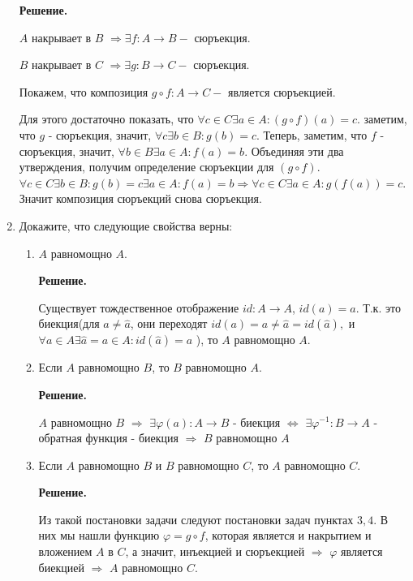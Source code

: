 \begin{enumerate}
\textbf{Решение.} 

$A$ накрывает в $B$ $\Rightarrow \exists f:A\rightarrow B - $ сюръекция.

$B$ накрывает в $C$ $\Rightarrow \exists g:B\rightarrow C - $ сюръекция.

Покажем, что композиция $g \circ f : A\rightarrow C - $ является 
сюръекцией.

Для этого достаточно показать, что $\forall c \in C \exists a \in A : (g 
\circ f)(a) = c$. заметим, что $g$ - сюръекция, значит, $\forall c \exists 
b \in B : g(b) = c$. Теперь, заметим, что $f$ - сюръекция, значит, 
$\forall b \in B \exists a \in A : f(a) = b$. Объединяя эти два 
утверждения, получим определение сюръекции для $(g \circ f)$. $\forall c 
\in C \exists b \in B : g(b) = c \exists a \in A : f(a) = b \Rightarrow 
\forall c \in C \exists a \in A : g(f(a)) = c$. Значит композиция 
сюръекций снова сюръекция.

\item Докажите, что следующие свойства верны:
\begin{enumerate}
\item $A$ равномощно $A$.

\textbf{Решение.} 

Существует тождественное отображение $id: A\rightarrow A$, $id(a) = a$. 
Т.к. это биекция(для 
$a\neq \hat{a}$, они переходят $id(a) = a \neq \hat{a} = id(\hat{a}),$ и 
$\forall a\in A 
\exists\hat{a} = a \in A : id(\hat{a}) = a$ ), то $A$ равномощно $A$. 

\item Если $A$ равномощно $B$, то $B$ равномощно $A$.

\textbf{Решение.} 

$A$ равномощно $B$ $\Rightarrow$ $\exists \varphi(a):A\rightarrow B$ - 
биекция 
$\Leftrightarrow$ $\exists \varphi^{-1} : B \rightarrow A$ - обратная 
функция - биекция 
$\Rightarrow$ $B$ равномощно $A$ 


\item Если $A$ равномощно $B$ и $B$ равномощно $C$, то $A$ равномощно $C$.

\textbf{Решение.} 

Из такой постановки задачи следуют постановки задач пунктах $3, 4$. В них 
мы нашли функцию 
$\varphi = g \circ f$, которая является и накрытием и вложением $A$ в $C$, 
а значит, инъекцией 
и сюръекцией $\Rightarrow$ $\varphi$ является биекцией $\Rightarrow$ $A$ 
равномощно $C$.

\end{enumerate}


\end{enumerate}
